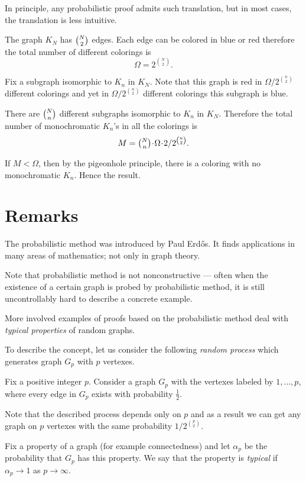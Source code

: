 In principle,  any probabilistic proof admits such translation,
but in most cases, the translation is less intuitive. 

The graph $K_N$ has $\tbinom{N}{2}$ edges.
Each edge can be colored in blue or red therefore the total number of different colorings is \[\Omega=2^{\binom{N}{2}}.\]

Fix a subgraph isomorphic to $K_n$ in $K_N$.
Note that this graph is red in $\Omega/2^{\binom n2}$ different colorings
and yet in $\Omega/2^{\binom n2}$ different colorings this subgraph is blue.

There are $\tbinom Nn$ different subgraphs isomorphic to $K_n$ in $K_N$.
Therefore the total number of monochromatic $K_n$'s in all the colorings 
is 
\[M=\tbinom Nn\cdot\Omega\cdot  2/2^{\binom n2}.\]

If $M<\Omega$, then by the pigeonhole principle,
there is a coloring with no monochromatic $K_n$.
Hence the result.
\qeds

\section*{Remarks}

The probabilistic method was introduced by Paul Erd\H os.
It  finds applications in many areas of mathematics; not only in graph theory.

Note that probabilistic method is not nonconstructive ---
often when the existence of a certain graph is probed by probabilistic method,
it is still uncontrollably hard to describe a concrete example.

More involved examples of proofs based on the probabilistic method deal with \emph{typical properties} of random graphs.

To describe the concept, let us consider the following \emph{random process} which generates graph $G_p$ with $p$ vertexes.

Fix a positive integer $p$. 
Consider a graph $G_p$ with the vertexes labeled by $1,\dots,p$,
where every edge in $G_p$ exists with probability $\tfrac12$.

Note that the described process depends only on $p$ and as a result we can get any graph on $p$ vertexes with the same probability $1/2^{\binom{p}{2}}$.

Fix a property of a graph (for example connectedness)
and let $\alpha_p$ be the probability that $G_p$ has this property.
We say that the property is \emph{typical} if $\alpha_p\to 1$ as $p\to \infty$.

